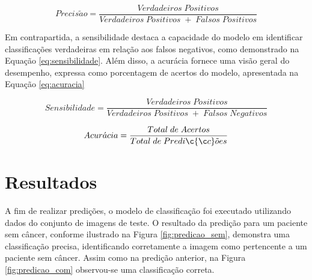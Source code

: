 \begin{equation}\label{eq:precisao}
Precis\tilde{a}o = \frac{Verdadeiros\;Positivos}{Verdadeiros\;Positivos\;+\;Falsos\;Positivos}
\end{equation}

Em contrapartida, a sensibilidade destaca a capacidade do modelo em identificar classificações verdadeiras em relação aos falsos negativos, como demonstrado na Equação \ref{eq:sensibilidade}. Além disso, a acurácia fornece uma visão geral do desempenho, expressa como porcentagem de acertos do modelo, apresentada na Equação \ref{eq:acuracia}

\begin{equation}\label{eq:sensibilidade}
Sensibilidade = \frac{Verdadeiros\;Positivos}{Verdadeiros\;Positivos\;+\;Falsos\;Negativos}
\end{equation}

\begin{equation}\label{eq:acuracia}
Acur\acute{a}cia = \frac{Total\;de\;Acertos}{Total\;de\;Predi\c{ç}\tilde{o}es}
\end{equation}



\section{\esp Resultados} \label{results}

A fim de realizar predições, o modelo de classificação foi executado utilizando dados do conjunto de imagens de teste. O resultado da predição para um paciente sem câncer, conforme ilustrado na Figura \ref{fig:predicao_sem}, demonstra uma classificação precisa, identificando corretamente a imagem como pertencente a um paciente sem câncer. Assim como na predição anterior, na Figura \ref{fig:predicao_com} observou-se uma classificação correta.

